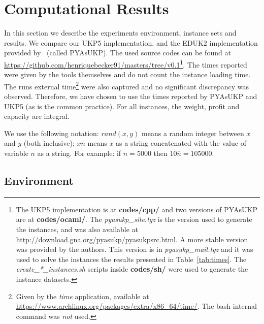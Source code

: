 \documentclass[runningheads,a4paper]{llncs}
\begin{document}
\section{Computational Results}
In this section we describe the experiments environment, instance sets and results. We compare our UKP5 implementation, and the EDUK2 implementation provided by~\cite{pya} (called PYAsUKP). 
The used source codes can be found at \url{https://github.com/henriquebecker91/masters/tree/v0.1}\footnote{The UKP5 implementation is at \textbf{codes/cpp/} and two versions of PYAsUKP are at \textbf{codes/ocaml/}. The \emph{pyasukp\_site.tgz} is the version used to generate the instances, and was also available at \url{http://download.gna.org/pyasukp/pyasukpsrc.html}. 
A more stable version was provided by the authors. 
This version is in \emph{pyasukp\_mail.tgz} and it was used to solve the instances the results presented in Table~\ref{tab:times}. 
The \emph{create\_*\_instances.sh} scripts inside \textbf{codes/sh/} were used to generate the instance datasets.}. 
The times reported were given by the tools themselves and do not count the instance loading time. 
The runs external time\footnote{Given by the \textit{time} application, available at \url{https://www.archlinux.org/packages/extra/x86_64/time/}. 
The bash internal command was \emph{not} used.} were also captured and no significant discrepancy was observed. 
Therefore, we have chosen to use the times reported by PYAsUKP and UKP5 (as is the common practice). 
For all instances, the weight, profit and capacity are integral.

We use the following notation: \(rand(x, y)\) means a random integer between \(x\) and \(y\) (both inclusive); \(x\overline{n}\) means \(x\) as a string concatenated with the value of variable \(n\) as a string. For example: if \(n = 5000\) then \(10\overline{n} = 105000\).


\subsection{Environment}
\end{document}
